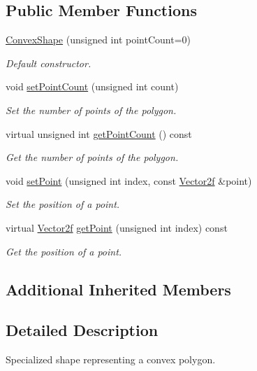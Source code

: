 \subsection*{Public Member Functions}
\begin{DoxyCompactItemize}
\item 
\hyperlink{classsf_1_1ConvexShape_a4f4686f57622bfbbe419ac1420b1432a}{Convex\-Shape} (unsigned int point\-Count=0)
\begin{DoxyCompactList}\small\item\em Default constructor. \end{DoxyCompactList}\item 
void \hyperlink{classsf_1_1ConvexShape_aea7c3f0f08f5cd457fe128a75b7c1e70}{set\-Point\-Count} (unsigned int count)
\begin{DoxyCompactList}\small\item\em Set the number of points of the polygon. \end{DoxyCompactList}\item 
virtual unsigned int \hyperlink{classsf_1_1ConvexShape_af81b86134fe54f2d50d9fab0db065ef1}{get\-Point\-Count} () const 
\begin{DoxyCompactList}\small\item\em Get the number of points of the polygon. \end{DoxyCompactList}\item 
void \hyperlink{classsf_1_1ConvexShape_ae5c7f87d0e776952e2ec6f0aa12ded31}{set\-Point} (unsigned int index, const \hyperlink{classsf_1_1Vector2}{Vector2f} \&point)
\begin{DoxyCompactList}\small\item\em Set the position of a point. \end{DoxyCompactList}\item 
virtual \hyperlink{classsf_1_1Vector2}{Vector2f} \hyperlink{classsf_1_1ConvexShape_ae2a18b837cd4454e340599a220c09a34}{get\-Point} (unsigned int index) const 
\begin{DoxyCompactList}\small\item\em Get the position of a point. \end{DoxyCompactList}\end{DoxyCompactItemize}
\subsection*{Additional Inherited Members}


\subsection{Detailed Description}
Specialized shape representing a convex polygon. 

